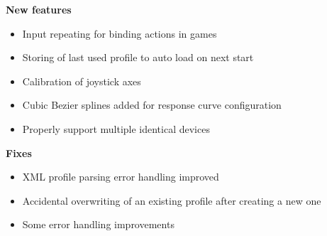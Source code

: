 \documentclass[a4, 10pt]{article}
\begin{document}
\textbf{New features}
\begin{itemize}
    \item Input repeating for binding actions in games
    \item Storing of last used profile to auto load on next start
    \item Calibration of joystick axes
    \item Cubic Bezier splines added for response curve configuration
    \item Properly support multiple identical devices
\end{itemize}

\noindent \textbf{Fixes}
\begin{itemize}
    \item XML profile parsing error handling improved
    \item Accidental overwriting of an existing profile after creating a
        new one
    \item Some error handling improvements
\end{itemize}



%
%
\end{document}
